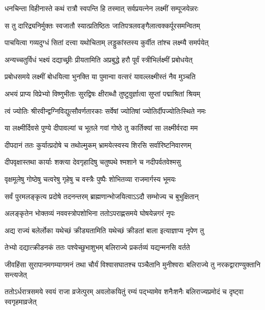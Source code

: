 \twolineshloka
{धनचिन्ता विहीनास्ते कथं रात्रौ स्वपन्ति हि}
{तस्मात् सर्वप्रयत्नेन लक्ष्मीं सम्पूजयेन्नरः} %

\twolineshloka
{स तु दारिद्र्यनिर्मुक्तः स्वजातौ स्यात्प्रतिष्ठितः}
{जातिपत्रलवङ्गैलात्वक्कर्पूरसमन्वितम्} %

\twolineshloka
{पाचयित्वा गव्यदुग्धं सितां दत्त्वा यथोचिताम्}
{लड्डुकांस्तस्य कुर्वीत तांश्च लक्ष्म्यै समर्पयेत्} %

\twolineshloka
{अन्यच्चतुर्विधं भक्ष्यं दद्याच्छ्रीः प्रीयतामिति}
{अप्रबुद्धे हरौ पूर्वं स्त्रीभिर्लक्ष्मीं प्रबोधयेत्} %

\twolineshloka
{प्रबोधसमये लक्ष्मीं बोधयित्वा भुनक्ति या}
{पुमान्वा वत्सरं यावल्लक्ष्मीस्तं नैव मुञ्चति} %

\twolineshloka
{अभयं प्राप्य विप्रेभ्यो विष्णुभीताः सुरद्विषः}
{क्षीराब्धौ तुष्टुवुर्ज्ञात्वा सुप्तां पद्माश्रितां श्रियम्} %

\twolineshloka
{त्वं ज्योतिः श्रीरवीन्द्वग्निविद्युत्सौवर्णतारकाः}
{सर्वेषां ज्योतिषां ज्योतिर्दीपज्योतिःस्थिते नमः} %

\twolineshloka
{या लक्ष्मीर्दिवसे पुण्ये दीपावल्यां च भूतले}
{गवां गोष्ठे तु कार्तिक्यां सा लक्ष्मीर्वरदा मम} %

\twolineshloka
{दीपदानं ततः कुर्यात्प्रदोषे च तथोल्मुकम्}
{भ्रामयेत्स्वस्य शिरसि सर्वारिष्टनिवारणम्} %

\twolineshloka
{दीपवृक्षास्तथा कार्याः शक्त्या देवगृहादिषु}
{चतुष्पथे श्मशाने च नदीपर्वतवेश्मसु} %

\twolineshloka
{वृक्षमूलेषु गोष्ठेषु चत्वरेषु गृहेषु च}
{वस्त्रैः पुष्पैः शोभितव्या राजमार्गस्य भूमयः} %

\twolineshloka
{सर्वं पुरमलङ्कृत्य प्रदोषे तदनन्तरम्}
{ब्राह्मणान्भोजयित्वाऽऽदौ सम्भोज्य च बुभुक्षितान्} %

\twolineshloka
{अलङ्कृतेन भोक्तव्यं नववस्त्रोपशोभिना}
{ततोऽपराह्णसमये घोषयेन्नगरं नृपः} %

\twolineshloka
{अद्य राज्यं बलेर्लोका यथेच्छं क्रीड्यतामिति}
{यथेच्छं क्रीडतां बाला इत्याज्ञाप्य नृपेण तु} %

\twolineshloka
{तेभ्यो दद्यात्क्रीडनकं ततः पश्येच्छुभाशुभम्}
{बलिराज्ये प्रकर्तव्यं यद्यन्मनसि वर्तते} %

\threelineshloka
{जीवहिंसा सुरापानमगम्यागमनं तथा}
{चौर्यं विश्वासघातश्च पञ्चैतानि मुनीश्वराः}
{बलिराज्ये तु नरकद्वाराण्युक्तानि सन्त्यजेत्} %

\threelineshloka
{ततोऽर्धरात्रसमये स्वयं राजा व्रजेत्पुरम्}
{अवलोकयितुं रम्यं पद्भ्यामेव शनैःशनैः}
{बलिराज्यप्रमोदं च दृष्ट्वा स्वगृहमाव्रजेत्} %

